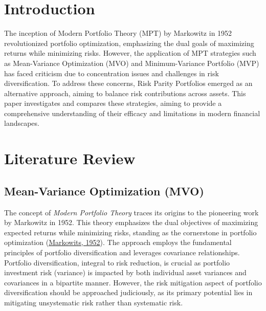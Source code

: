 \documentclass[12pt,preprint, authoryear]{elsarticle}
\numberwithin{equation}{section}
\numberwithin{figure}{section}
\numberwithin{table}{section}
\begin{document}

\headsep 35pt %




\newpage

\newpage

\hypertarget{introduction}{%
\section*{Introduction}\label{introduction}}

The inception of Modern Portfolio Theory (MPT) by Markowitz in 1952
revolutionized portfolio optimization, emphasizing the dual goals of
maximizing returns while minimizing risks. However, the application of
MPT strategies such as Mean-Variance Optimization (MVO) and
Minimum-Variance Portfolio (MVP) has faced criticism due to
concentration issues and challenges in risk diversification. To address
these concerns, Risk Parity Portfolios emerged as an alternative
approach, aiming to balance risk contributions across assets. This paper
investigates and compares these strategies, aiming to provide a
comprehensive understanding of their efficacy and limitations in modern
financial landscapes.

\hypertarget{literature-review}{%
\section{\texorpdfstring{Literature Review
\label{-}}{Literature Review }}\label{literature-review}}

\hypertarget{mean-variance-optimization-mvo}{%
\subsection{Mean-Variance Optimization
(MVO)}\label{mean-variance-optimization-mvo}}

The concept of \emph{Modern Portfolio Theory} traces its origins to the
pioneering work by Markowitz in 1952. This theory emphasizes the dual
objectives of maximizing expected returns while minimizing risks,
standing as the cornerstone in portfolio optimization
(\protect\hyperlink{ref-markowits1952portfolio}{Markowits, 1952}). The
approach employs the fundamental principles of portfolio diversification
and leverages covariance relationships. Portfolio diversification,
integral to risk reduction, is crucial as portfolio investment risk
(variance) is impacted by both individual asset variances and
covariances in a bipartite manner. However, the risk mitigation aspect
of portfolio diversification should be approached judiciously, as its
primary potential lies in mitigating unsystematic risk rather than
systematic risk.
\end{document}
